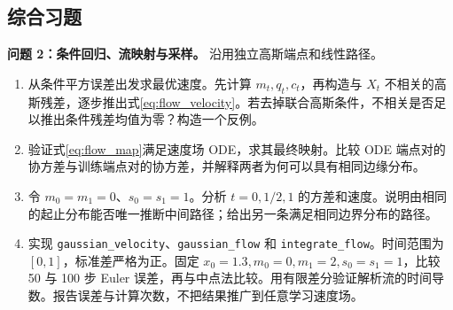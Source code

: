 \subsection{综合习题}\label{prob:flow}
\textbf{问题 2：条件回归、流映射与采样。} 沿用独立高斯端点和线性路径。
\begin{enumerate}
\item\label{part:flow-a} 从条件平方误差出发求最优速度。先计算 $m_t,q_t,c_t$，再构造与 $X_t$ 不相关的高斯残差，逐步推出式\eqref{eq:flow_velocity}。若去掉联合高斯条件，不相关是否足以推出条件残差均值为零？构造一个反例。
\item\label{part:flow-b} 验证式\eqref{eq:flow_map}满足速度场 ODE，求其最终映射。比较 ODE 端点对的协方差与训练端点对的协方差，并解释两者为何可以具有相同边缘分布。
\item\label{part:flow-c} 令 $m_0=m_1=0$、$s_0=s_1=1$。分析 $t=0,1/2,1$ 的方差和速度。说明由相同的起止分布能否唯一推断中间路径；给出另一条满足相同边界分布的路径。
\item\label{part:flow-d} 实现 \texttt{gaussian\_velocity}、\texttt{gaussian\_flow} 和 \texttt{integrate\_flow}。时间范围为 $[0,1]$，标准差严格为正。固定 $x_0=1.3,m_0=0,m_1=2,s_0=s_1=1$，比较 50 与 100 步 Euler 误差，再与中点法比较。用有限差分验证解析流的时间导数。报告误差与计算次数，不把结果推广到任意学习速度场。
\end{enumerate}

